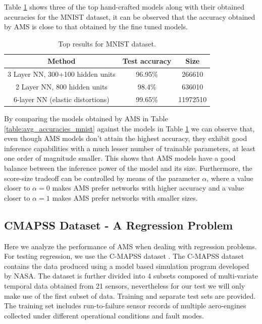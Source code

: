 \documentclass[12pt]{elsart}%
\begin{document}
Table \ref{table:MNIST_results_top} shows three of the top hand-crafted models along with their obtained accuracies for the MNIST dataset, it can be observed that the accuracy obtained by AMS is close to that obtained by the fine tuned models. 

\begin{table}[!htb]
\begin{center}
\begin{tabular}{| c | c | c |}
\hline
Method & Test accuracy & Size\\
\hline
3 Layer NN, 300+100 hidden units \cite{lecun-98} &  96.95\% & 266610\\
2 Layer NN, 800 hidden units \cite{Simard2003} & 98.4\% & 636010\\
6-layer NN (elastic distortions) \cite{Ciresan2010}  & 99.65\% & 11972510\\
\hline
\end{tabular}
\end{center}
\caption{Top results for MNIST dataset.}
\label{table:MNIST_results_top}
\end{table}

By comparing the models obtained by AMS in Table \ref{table:avg_accuracies_mnist} against the models in Table \ref{table:MNIST_results_top} we can observe that, even though AMS models don't attain the highest accuracy, they exhibit good inference capabilities with a much lesser number of trainable parameters, at least one order of magnitude smaller. This shows that AMS models have a good balance between the inference power of the model and its size. Furthermore, the score-size tradeoff can be controlled by means of the parameter $\alpha$, where a value closer to $\alpha=0$ makes AMS prefer networks with higher accuracy and a value closer to $\alpha = 1$ makes AMS prefer networks with smaller sizes.


\subsection{CMAPSS Dataset - A Regression Problem}

Here we analyze the performance of AMS when dealing with regression problems. For testing regression, we use the C-MAPSS dataset \cite{CMAPS2008}. The C-MAPSS dataset contains the data produced using a model based simulation program developed by NASA. The dataset is further divided into 4 subsets composed of multi-variate temporal data obtained from 21 sensors, nevertheless for our test we will only make use of the first subset of data. Training and separate test sets are provided. The training set includes run-to-failure sensor records of multiple aero-engines collected under different operational conditions and fault modes.
\end{document}
